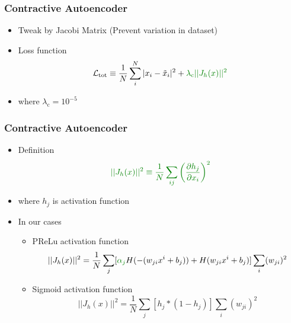 \documentclass{beamer}
\begin{document}
\begin{frame}
\frametitle{Contractive Autoencoder}

\begin{itemize}
    \item Tweak by \textcolor[RGB]{0,128,0}{Jacobi Matrix (Prevent variation in dataset)}
    \item Loss function
    \begin{equation}
        \mathcal{L}_{\text{tot}} \equiv \frac{1}{N}\sum_i^N |x_i-\tilde{x}_i|^2 + \textcolor[RGB]{0,128,0}{\lambda_{\text{c}}||J_h(x)||^2}
    \end{equation}
    \item where $\lambda_{\text{c}} = 10^{-5}$
\end{itemize}
\end{frame}
\begin{frame}
\frametitle{Contractive Autoencoder}
\begin{itemize}
    \item Definition
    \begin{equation}
        \textcolor[RGB]{0,128,0}{||J_h(x)||^2 \equiv \frac{1}{N}\sum_{ij}\left(\frac{\partial h_j}{\partial x_i}\right)^2}
    \end{equation}
    \item where $h_j$ is activation function
    \item In our cases
    \begin{itemize}
        \item PReLu activation function
        \begin{equation}
            ||J_h(x)||^2 = \frac{1}{N}\sum_j[\textcolor[RGB]{0,128,0}{\alpha_j}H(-(w_{ji}x^i+b_j)) + H(w_{ji}x^i+b_j)]\sum_i(w_{ji})^2
        \end{equation}
        \item Sigmoid activation function
        \begin{equation}
            ||J_h(x)||^2 = \frac{1}{N}\sum_j[h_j*(1-h_j)]\sum_i(w_{ji})^2
        \end{equation}
    \end{itemize}
\end{itemize}

\end{frame}
\end{document}
